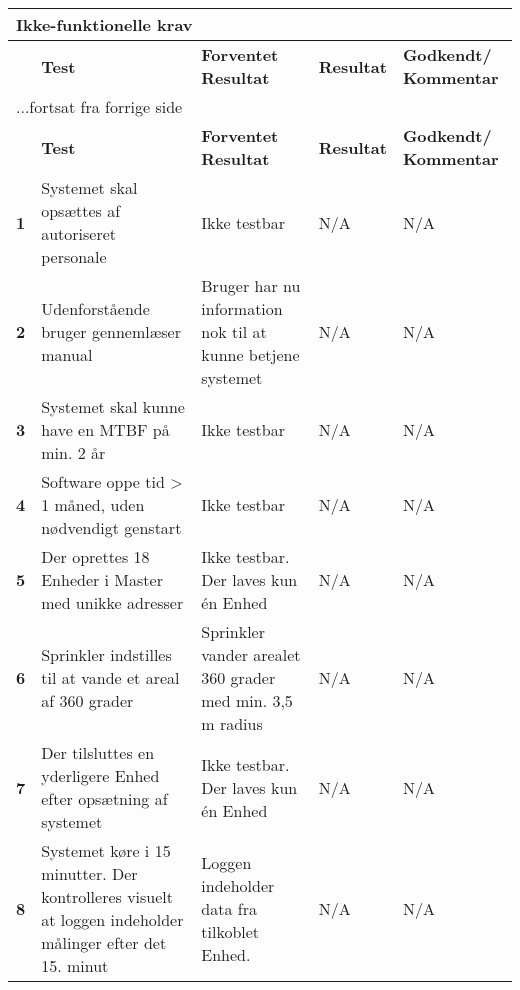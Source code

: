 \begin{center}
\begin{longtable}{|p{}|p{}|p{}|p{}|p{}|} %
\hline
\multicolumn{5}{|l|}{\textbf{Ikke-funktionelle krav}} \\ \hline
\multicolumn{1}{|c|}{} &
\textbf{Test} &
\textbf{Forventet \newline Resultat} &
\textbf{Resultat} &
\textbf{Godkendt/ \newline Kommentar} \\ \hline 
\endfirsthead

\multicolumn{5}{l}{...fortsat fra forrige side} \\ \hline 
\multicolumn{1}{|c|}{} &
\textbf{Test} &
\textbf{Forventet \newline Resultat} &
\textbf{Resultat} &
\textbf{Godkendt/ \newline Kommentar} \\ \hline 
\endhead

\textbf{1}	&Systemet skal opsættes af autoriseret personale
			&Ikke testbar
			&N/A
			&N/A \\ \hline 
			
\textbf{2}	&Udenforstående bruger gennemlæser manual
			&Bruger har nu information nok til at kunne betjene systemet
			&N/A
			&N/A \\ \hline 
			
\textbf{3}	&Systemet skal kunne have en MTBF på min. 2 år
			&Ikke testbar
			&N/A
			&N/A \\ \hline 
			
\textbf{4}	&Software oppe tid > 1 måned, uden nødvendigt genstart
			&Ikke testbar
			&N/A
			&N/A \\ \hline 
			
\textbf{5}	&Der oprettes 18 Enheder i Master med unikke adresser
			&Ikke testbar. Der laves kun én Enhed
			&N/A
			&N/A \\ \hline 
			
\textbf{6}	&Sprinkler indstilles til at vande et areal af 360 grader
			&Sprinkler vander arealet 360 grader med min. 3,5 m radius
			&N/A
			&N/A \\ \hline 
			
\textbf{7}	&Der tilsluttes en yderligere Enhed efter opsætning af systemet
			&Ikke testbar. Der laves kun én Enhed
			&N/A
			&N/A \\ \hline 
			
\textbf{8}	&Systemet køre i 15 minutter. Der kontrolleres visuelt at loggen indeholder målinger efter det 15. minut
			&Loggen indeholder data fra tilkoblet Enhed.
			&N/A
			&N/A \\ \hline 
			

\end{longtable}
\end{center}
